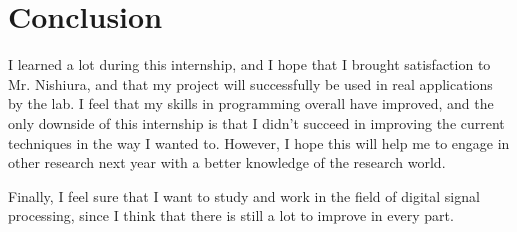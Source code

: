 \chapter*{Conclusion}
I learned a lot during this internship, and I hope that I brought satisfaction to Mr. Nishiura, and that my project will successfully be used in real applications by the lab.
I feel that my skills in programming overall have improved, and the only downside of this internship is that I didn't succeed in improving the current techniques in the way I wanted to. However, I hope this will help me to engage in other research next year with a better knowledge of the research world.

Finally, I feel sure that I want to study and work in the field of digital signal processing, since I think that there is still a lot to improve in every part.
